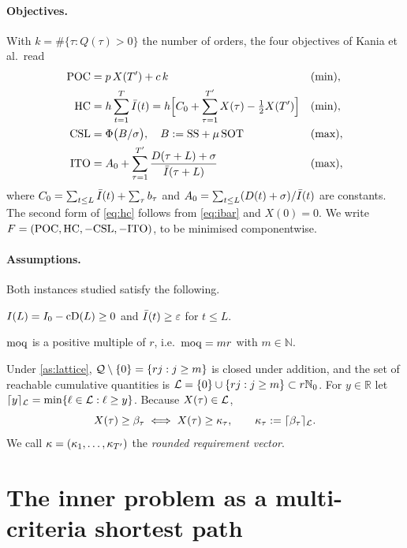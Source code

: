 \paragraph{Objectives.}
With $k=\#\{\tau : Q(\tau)>0\}$ the number of orders, the four objectives of
Kania et al.\ read
\begin{align}
  \mathrm{POC} &= p\,X(T')+c\,k &&\text{(min)},\label{eq:poc}\\
  \mathrm{HC}  &= h\sum_{t=1}^{T}\bar I(t)
        = h\Bigl[C_0+\sum_{\tau=1}^{T'}X(\tau)-\tfrac12X(T')\Bigr]
        &&\text{(min)},\label{eq:hc}\\
  \mathrm{CSL} &= \Phi\bigl(B/\sigma\bigr),\quad B:=\mathrm{SS}+\mu\,\mathrm{SOT} &&\text{(max)},\label{eq:csl}\\
  \mathrm{ITO} &= A_0+\sum_{\tau=1}^{T'}\frac{D(\tau+L)+\sigma}{\bar I(\tau+L)} &&\text{(max)},\label{eq:ito}
\end{align}
where $C_0=\sum_{t\le L}\bar I(t)+\sum_{\tau}b_\tau$ and
$A_0=\sum_{t\le L}(D(t)+\sigma)/\bar I(t)$ are constants. The second form of
\eqref{eq:hc} follows from \eqref{eq:ibar} and $X(0)=0$. We write
$F=(\mathrm{POC},\mathrm{HC},-\mathrm{CSL},-\mathrm{ITO})$, to be minimised componentwise.

\paragraph{Assumptions.} Both instances studied satisfy the following.
\begin{assumption}\label{as:initial}
  $I(L)=I_0-\mathrm{cD}(L)\ge 0$ and $\bar I(t)\ge\varepsilon$ for $t\le L$.
\end{assumption}
\begin{assumption}\label{as:lattice}
  $\mathrm{moq}$ is a positive multiple of $r$, i.e.\ $\mathrm{moq}=m r$ with $m\in\mathbb{N}$.
\end{assumption}
Under \cref{as:lattice}, $\mathcal{Q}\setminus\{0\}=\{r j : j\ge m\}$ is closed under addition,
and the set of reachable cumulative quantities is
$\mathcal{L}=\{0\}\cup\{r j : j\ge m\}\subset r\mathbb{N}_0$. For $y\in\mathbb{R}$ let
$\lceil y\rceil_{\mathcal{L}}=\min\{\ell\in\mathcal{L} : \ell\ge y\}$. Because $X(\tau)\in\mathcal{L}$,
\begin{equation}\label{eq:kappa}
  X(\tau)\ge\beta_\tau \iff X(\tau)\ge\kappa_\tau,\qquad
  \kappa_\tau:=\lceil \beta_\tau\rceil_{\mathcal{L}}.
\end{equation}
We call $\kappa=(\kappa_1,\dots,\kappa_{T'})$ the \emph{rounded requirement vector}.

\section{The inner problem as a multi-criteria shortest path}\label{sec:inner}


